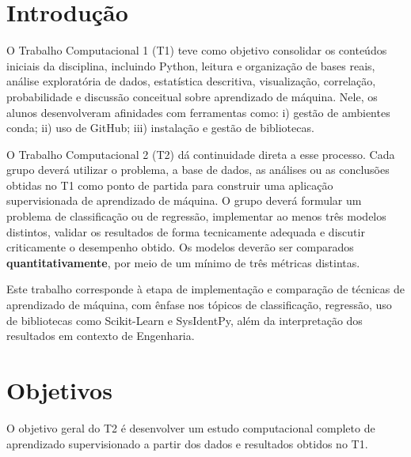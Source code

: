 \documentclass[a4paper]{ifacconf}
\begin{document}

\section{Introdução}

O Trabalho Computacional 1 (T1) teve como objetivo consolidar os conteúdos iniciais da disciplina, incluindo Python, leitura e organização de bases reais, análise exploratória de dados, estatística descritiva, visualização, correlação, probabilidade e discussão conceitual sobre aprendizado de máquina. Nele, os alunos desenvolveram afinidades com ferramentas como: i) gestão de ambientes conda; ii) uso de GitHub; iii) instalação e gestão de bibliotecas.

O Trabalho Computacional 2 (T2) dá continuidade direta a esse processo. Cada grupo deverá utilizar o problema, a base de dados, as análises ou as conclusões obtidas no T1 como ponto de partida para construir uma aplicação supervisionada de aprendizado de máquina. O grupo deverá formular um problema de classificação ou de regressão, implementar ao menos três modelos distintos, validar os resultados de forma tecnicamente adequada e discutir criticamente o desempenho obtido. Os modelos deverão ser comparados \textbf{quantitativamente}, por meio de um mínimo de três métricas distintas.

Este trabalho corresponde à etapa de implementação e comparação de técnicas de aprendizado de máquina, com ênfase nos tópicos de classificação, regressão, uso de bibliotecas como Scikit-Learn e SysIdentPy, além da interpretação dos resultados em contexto de Engenharia.

\section{Objetivos}

O objetivo geral do T2 é desenvolver um estudo computacional completo de aprendizado supervisionado a partir dos dados e resultados obtidos no T1.
\end{document}
